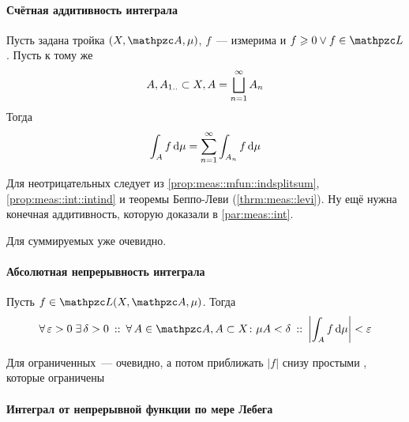 \documentclass[draft, timbord]{longnotes}
\begin{document}
\paragraph{Счётная аддитивность интеграла}
\begin{thrm}\label{thrm:meas::infadd}
  Пусть задана тройка $(X,\alg,\mu)$, $f$~--- измерима и $f \geqslant 0 \lor f \in \summb$. 
  Пусть к тому же 
  \[
    A, A_{1\mathbin{..}} \subset X, A = \bigsqcup_{n=1}^\infty A_n
  \]
  Тогда 
  \[
    \int _A f \, \mathrm{d} \mu = \sum_{n=1}^\infty \int _{A_n} f\, \mathrm{d} \mu 
  \]
\end{thrm}
\begin{tproof}
  Для неотрицательных следует из \ref{prop:meas::mfun::indsplitsum}, \ref{prop:meas::int::intind}
  и теоремы Беппо-Леви (\ref{thrm:meas::levi}). Ну ещё нужна конечная аддитивность, которую
  доказали в \ref{par:meas::int}.
  
  Для суммируемых уже очевидно.

\end{tproof}


\paragraph{Абсолютная непрерывность интеграла}
\begin{thrm}\label{thrm:meas::abscont}
  Пусть $f\in \summb(X,\alg,\mu)$. Тогда
  \[
    \forall\, \varepsilon > 0 \; \exists\, \delta > 0 \that \forall\, A \in \alg , A \subset X
    \colon \mu A < \delta \holds \left| \int_A f \, \del \mu \right| < \varepsilon 
  \]
\end{thrm}
\begin{tproof}
  Для ограниченных~--- очевидно, а потом приближать $|f|$ снизу простыми , которые ограничены
\end{tproof}

\paragraph{Интеграл от непрерывной функции по мере Лебега}
\label{par:meas::contint}
\end{document}
